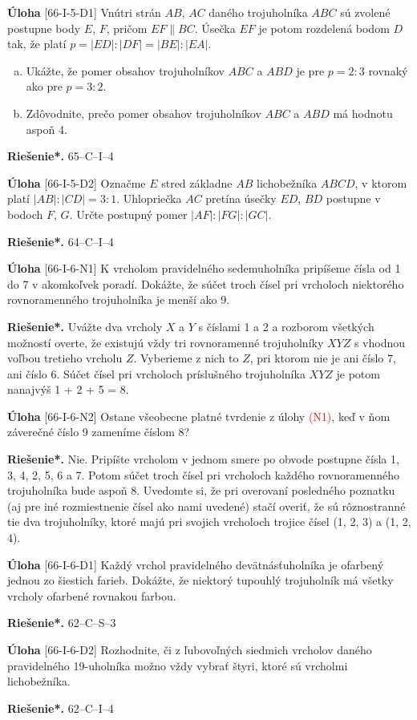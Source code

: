 \documentclass{article}
\newcommand{\rieh}{\textbf{Riešenie*.} }
\newcommand\todo[1]{\noindent\textcolor{red}{(#1)}}
\newcommand{\problem}[4]{
  \begin{tcolorbox}[breakable,notitle,boxrule=0pt,colback=light-gray,colframe=light-gray]
    \textbf{Úloha}
    [#1] #3
  \end{tcolorbox}
  \noindent#4
}
\begin{document}
\problem{66-I-5-D1}{}{
Vnútri strán $AB$, $AC$ daného trojuholníka $ABC$ sú zvolené postupne body $E$, $F$, pričom $EF \parallel BC$. Úsečka $EF$ je potom rozdelená bodom $D$ tak, že platí $p = |ED|: |DF | = |BE| : |EA|$.
\begin{enumerate}[a)]
    \item Ukážte, že pomer obsahov trojuholníkov $ABC$ a $ABD$ je pre $p = 2 : 3$ rovnaký ako pre $p = 3 : 2$.
    \item Zdôvodnite, prečo pomer obsahov trojuholníkov $ABC$ a $ABD$ má hodnotu aspoň 4.
\end{enumerate}
}{
\rieh 65–C–I–4
}

\problem{66-I-5-D2}{}{
Označme $E$ stred základne $AB$ lichobežníka $ABCD$, v ktorom platí $|AB| : |CD| = 3 : 1$. Uhlopriečka $AC$ pretína úsečky $ED$, $BD$ postupne v bodoch $F$, $G$. Určte postupný pomer $|AF | : |F G| : |GC|$.
}{
\rieh 64–C–I–4
}


\problem{66-I-6-N1}{}{
K vrcholom pravidelného sedemuholníka pripíšeme čísla od 1 do 7 v akomkoľvek poradí. Dokážte, že súčet troch čísel pri vrcholoch niektorého rovnoramenného trojuholníka je menší ako 9.
}{
\rieh Uvážte dva vrcholy $X$ a $Y$ s číslami 1 a 2 a rozborom všetkých možností overte, že existujú vždy tri rovnoramenné trojuholníky $XYZ$ s vhodnou voľbou tretieho vrcholu $Z$. Vyberieme z nich to $Z$, pri ktorom nie je ani číslo 7, ani číslo 6. Súčet čísel pri vrcholoch príslušného trojuholníka $XYZ$ je potom nanajvýš 1 + 2 + 5 = 8.
}

\problem{66-I-6-N2}{}{
Ostane všeobecne platné tvrdenie z úlohy \todo{N1}, keď v ňom záverečné číslo 9 zameníme číslom 8?
}{
\rieh Nie. Pripíšte vrcholom v jednom smere po obvode postupne čísla 1, 3, 4, 2, 5, 6 a 7. Potom súčet troch čísel pri vrcholoch každého rovnoramenného trojuholníka bude aspoň 8. Uvedomte si, že pri overovaní posledného poznatku (aj pre iné rozmiestnenie čísel ako nami uvedené) stačí overiť, že sú rôznostranné tie dva trojuholníky, ktoré majú pri svojich vrcholoch trojice čísel (1, 2, 3) a (1, 2, 4).
}

\problem{66-I-6-D1}{}{
Každý vrchol pravidelného devätnásťuholníka je ofarbený jednou zo šiestich farieb. Dokážte, že niektorý tupouhlý trojuholník má všetky vrcholy ofarbené rovnakou farbou.
}{
\rieh 62–C–S–3
}

\problem{66-I-6-D2}{}{
Rozhodnite, či z ľubovoľných siedmich vrcholov daného pravidelného 19-uholníka možno vždy vybrať štyri, ktoré sú vrcholmi lichobežníka.
}{
\rieh 62–C–I–4
}
\end{document}
